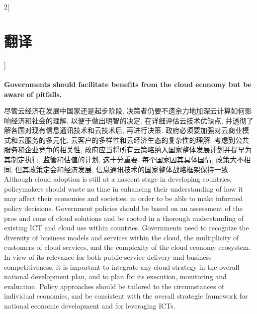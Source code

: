 \documentclass[a4paper, UTF8, 12pt]{article}
\begin{document}
\begin{paracol}{2}[\section{翻译}]
    \switchcolumn*
    \paragraph{} 
    \switchcolumn
    \paragraph{}
    {\bfseries Governments should facilitate benefits from the cloud economy but be aware of pitfalls.}

    \switchcolumn*
    尽管云经济在发展中国家还是起步阶段, 决策者仍要不遗余力地加深云计算如何影响经济和社会的理解, 以便于做出明智的决定. 在详细评估云技术优缺点, 并透彻了解各国对现有信息通讯技术和云技术后, 再进行决策. 政府必须要加强对云商业模式和云服务的多元化, 云客户的多样性和云经济生态的复杂性的理解. 考虑到公共服务和企业竞争的相关性, 政府应当将所有云策略纳入国家整体发展计划并提早为其制定执行, 监管和估值的计划, 这十分重要. 每个国家因其具体国情, 政策大不相同, 但其政策定会和经济发展, 信息通讯技术的国家整体战略框架保持一致.
    \switchcolumn
    Although cloud adoption is still at a nascent stage in developing countries, policymakers should waste no time in enhancing their understanding of how it may affect their economies and societies, in order to be able to make informed policy decisions. Government policies should be based on an assessment of the pros and cons of cloud solutions and be rooted in a thorough understanding of existing ICT and cloud use within countries. Governments need to recognize the diversity of business models and services within the cloud, the multiplicity of customers of cloud services, and the complexity of the cloud economy ecosystem. In view of its relevance for both public service delivery and business competitiveness, it is important to integrate any cloud strategy in the overall national development plan, and to plan for its execution, monitoring and evaluation. Policy approaches should be tailored to the circumstances of individual economies, and be consistent with the overall strategic framework for national economic development and for leveraging ICTs.


\end{paracol}
\end{document}

